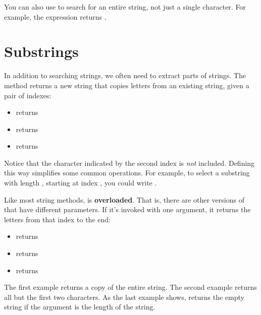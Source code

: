 You can also use  to search for an entire string, not just a single character.
For example, the expression  returns .


\section{Substrings}
\label{loops-strings_substrings}


In addition to searching strings, we often need to extract parts of strings.
The  method returns a new string that copies letters from an existing string, given a pair of indexes:

\begin{itemize}
\item {} returns 
\item {} returns 
\item {} returns 
\end{itemize}

Notice that the character indicated by the second index is {\em not} included.
Defining  this way simplifies some common operations.
For example, to select a substring with length , starting at index , you could write .


Like most string methods,  is {\bf overloaded}.
That is, there are other versions of  that have different parameters.
If it's invoked with one argument, it returns the letters from that index to the end:

\begin{itemize}
\item {} returns 
\item {} returns 
\item {} returns 
\end{itemize}

The first example returns a copy of the entire string.
The second example returns all but the first two characters.
As the last example shows,  returns the empty string if the argument is the length of the string.

